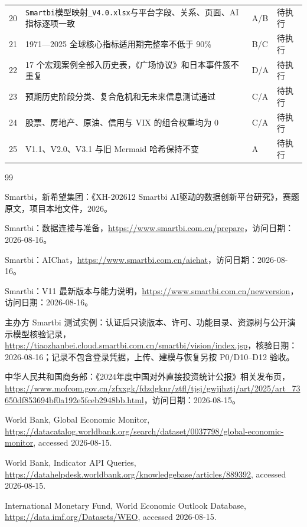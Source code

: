 \documentclass[UTF8,fontset=windows,12pt,openany]{ctexbook}
\newcommand{\File}[1]{{\small\nolinkurl{#1}}}
\begin{document}
\begin{longtable}{p{1.4cm}p{9.1cm}p{1.8cm}p{1.8cm}}
20 & \File{Smartbi}\textsf{模型映射}\File{_V4.0.xlsx}与平台字段、关系、页面、AI 指标逐项一致 & A/B & 待执行\\
21 & 1971—2025 全球核心指标适用期完整率不低于 90\% & B/C & 待执行\\
22 & 17 个宏观案例全部入历史表，《广场协议》和日本事件簇不重复 & D/A & 待执行\\
23 & 预期历史阶段分类、复合危机和无未来信息测试通过 & C/A & 待执行\\
24 & 股票、房地产、原油、信用与 VIX 的组合权重均为 0 & C/A & 待执行\\
25 & V1.1、V2.0、V3.1 与旧 Mermaid 哈希保持不变 & A & 待执行\\
\bottomrule
\end{longtable}

\backmatter

\begin{thebibliography}{99}

Smartbi，新希望集团：《XH-202612 Smartbi AI驱动的数据创新平台研究》，赛题原文，项目本地文件，2026。

Smartbi：数据连接与准备，\url{https://www.smartbi.com.cn/prepare}，访问日期：2026-08-16。

Smartbi：AIChat，\url{https://www.smartbi.com.cn/aichat}，访问日期：2026-08-16。

Smartbi：V11 最新版本与能力说明，\url{https://www.smartbi.com.cn/newversion}，访问日期：2026-08-16。

主办方 Smartbi 测试实例：认证后只读版本、许可、功能目录、资源树与公开演示模型核验记录，\url{https://tiaozhanbei.cloud.smartbi.com.cn/smartbi/vision/index.jsp}，核验日期：2026-08-16；记录不包含登录凭据，上传、建模与恢复另按 P0/D10--D12 验收。

中华人民共和国商务部：《2024年度中国对外直接投资统计公报》相关发布页，\url{https://www.mofcom.gov.cn/zfxxgk/fdzdgknr/ztfl/tjsj/gwjjhztj/art/2025/art_73650df853694bf0a192e5fceb2948bb.html}，访问日期：2026-08-15。

World Bank, Global Economic Monitor, \url{https://datacatalog.worldbank.org/search/dataset/0037798/global-economic-monitor}, accessed 2026-08-15.

World Bank, Indicator API Queries, \url{https://datahelpdesk.worldbank.org/knowledgebase/articles/889392}, accessed 2026-08-15.

International Monetary Fund, World Economic Outlook Database, \url{https://data.imf.org/Datasets/WEO}, accessed 2026-08-15.


\end{thebibliography}
\end{document}

